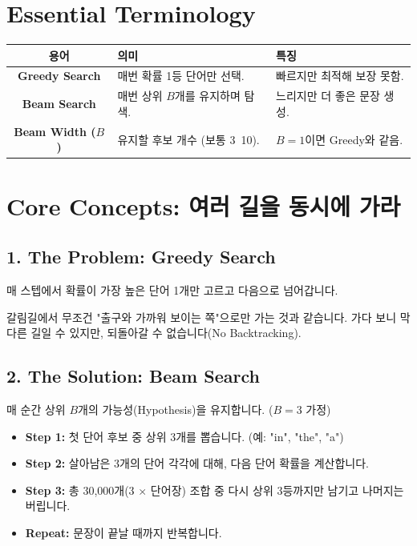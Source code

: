 \documentclass[11pt,a4paper]{book}
\theoremstyle{definition}
\begin{document}
\section{Essential Terminology}
\begin{center}
\begin{tabular}{|c|l|l|}
\hline
\textbf{용어} & \textbf{의미} & \textbf{특징} \\ \hline
\textbf{Greedy Search} & 매번 확률 1등 단어만 선택. & 빠르지만 최적해 보장 못함. \\ \hline
\textbf{Beam Search} & 매번 상위 $B$개를 유지하며 탐색. & 느리지만 더 좋은 문장 생성. \\ \hline
\textbf{Beam Width ($B$)} & 유지할 후보 개수 (보통 3~10). & $B=1$이면 Greedy와 같음. \\ \hline
\end{tabular}
\end{center}

\section{Core Concepts: 여러 길을 동시에 가라}

\subsection{1. The Problem: Greedy Search}

매 스텝에서 확률이 가장 높은 단어 1개만 고르고 다음으로 넘어갑니다.
\begin{analogybox}[title={미로 찾기}]
갈림길에서 무조건 "출구와 가까워 보이는 쪽"으로만 가는 것과 같습니다. 가다 보니 막다른 길일 수 있지만, 되돌아갈 수 없습니다(No Backtracking).
\end{analogybox}

\subsection{2. The Solution: Beam Search}

매 순간 상위 $B$개의 가능성(Hypothesis)을 유지합니다. ($B=3$ 가정)

\begin{itemize}
    \item \textbf{Step 1:} 첫 단어 후보 중 상위 3개를 뽑습니다. (예: "in", "the", "a")
    \item \textbf{Step 2:} 살아남은 3개의 단어 각각에 대해, 다음 단어 확률을 계산합니다.
    \item \textbf{Step 3:} 총 30,000개(3 $\times$ 단어장) 조합 중 다시 상위 3등까지만 남기고 나머지는 버립니다.
    \item \textbf{Repeat:} 문장이 끝날 때까지 반복합니다.
\end{itemize}
\end{document}
